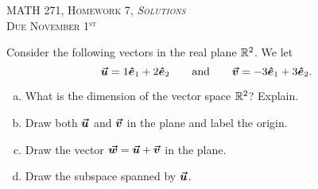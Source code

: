 \documentclass[12pt]{article} %
\newcommand{\ehat}{\boldsymbol{\hat{e}}}
\begin{document}
\begin{center}
   \textsc{\large MATH 271, Homework 7, \emph{Solutions}}\\
   \textsc{Due November 1$^\textrm{st}$}
\end{center}
\vspace{.5cm}



\newpage
\begin{problem}
Consider the following vectors in the real plane $\mathbb{R}^2$. We let
\[
\vecu = 1\ehat_1 + 2\ehat_2 \qquad \textrm{and} \qquad \vecv = -3\ehat_1+ 3\ehat_2.
\]
\begin{enumerate}[(a)]
    \item What is the dimension of the vector space $\mathbb{R}^2$? Explain.
    \item Draw both $\boldsymbol{\vec{u}}$ and $\boldsymbol{\vec{v}}$ in the plane and label the origin.
    \item Draw the vector $\boldsymbol{\vec{w}} = \boldsymbol{\vec{u}}+\boldsymbol{\vec{v}}$ in the plane.
    \item Draw the subspace spanned by $\boldsymbol{\vec{u}}$.
\end{enumerate}
\end{problem}
\end{document}
